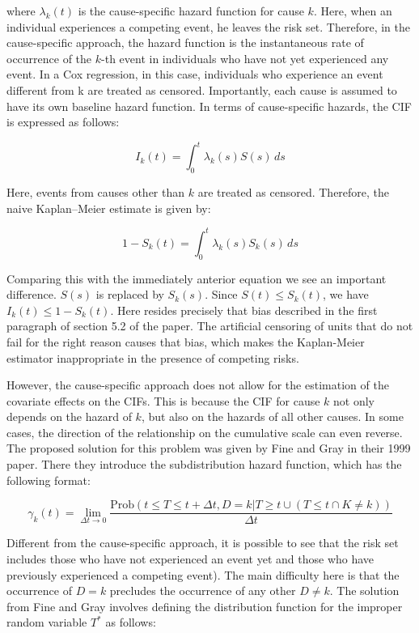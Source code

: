 \documentclass[12pt]{article}
\begin{document}
where  \(\lambda_k(t)\) is the cause-specific hazard function for cause \(k\). Here, when an individual experiences a competing event, he leaves the risk set. Therefore, in the cause-specific approach, the hazard function is the instantaneous rate of occurrence of the \(k\)-th event in individuals who have not yet experienced any event. In a Cox regression, in this case, individuals who experience an event different from k are treated as censored. Importantly, each cause is assumed to have its own baseline hazard function. In terms of cause-specific hazards, the CIF is expressed as follows:

\begin{equation}
I_k(t) = \int_0^t \lambda_k(s) S(s) \, ds
\end{equation}

Here, events from causes other than \(k\) are treated as censored. Therefore, the naive Kaplan–Meier estimate is given by:

\begin{equation}
1 - S_k(t) = \int_0^t \lambda_k(s) S_k(s) \, ds
\end{equation} 

Comparing this with the immediately anterior equation we see an important difference. \( S(s) \) is replaced by \( S_k(s) \). Since \( S(t) \leq S_k(t) \), we have \( I_k(t) \leq 1 - S_k(t) \). Here resides precisely that bias described in the first paragraph of section 5.2 of the paper. The artificial censoring of units that do not fail for the right reason causes that bias, which makes the Kaplan-Meier estimator inappropriate in the presence of competing risks. 

However, the cause-specific approach does not allow for the estimation of the covariate effects on the CIFs. This is because the CIF for cause \(k\) not only depends on the hazard of \(k\), but also on the hazards of all other causes. In some cases, the direction of the relationship on the cumulative scale can even reverse. The proposed solution for this problem was given by Fine and Gray in their 1999 paper. There they introduce the subdistribution hazard function, which has the following format:

\begin{equation}
\gamma_k(t)=\lim_{\Delta t \to 0} \frac{\text{Prob}(t \leq T \leq t + \Delta t, D = k | T \geq t \cup (T \leq t \cap K \neq k))}{\Delta t}
\end{equation}

Different from the cause-specific approach, it is possible to see that the risk set includes those who have not experienced an event yet and those who have previously experienced a competing event). The main difficulty here is that the occurrence of \( D = k \) precludes the occurrence of any other \( D \neq k \). The solution from Fine and Gray involves defining the distribution function for the improper random variable \( T^* \) as follows:
\end{document}
